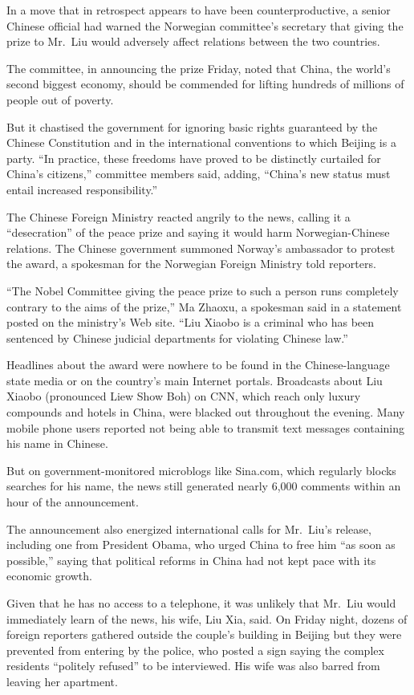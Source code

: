 ﻿\documentclass[12pt]{article}
\begin{document}
In a move that in retrospect appears to have been counterproductive, a senior Chinese official had
warned the Norwegian committee's secretary that giving the prize to Mr.~Liu would adversely affect
relations between the two countries.

The committee, in announcing the prize Friday, noted that China, the world's second biggest economy,
should be commended for lifting hundreds of millions of people out of poverty.

But it chastised the government for ignoring basic rights guaranteed by the Chinese Constitution and
in the international conventions to which Beijing is a party. ``In practice, these freedoms have
proved to be distinctly curtailed for China's citizens,'' committee members said, adding, ``China's
new status must entail increased responsibility.''

The Chinese Foreign Ministry reacted angrily to the news, calling it a ``desecration'' of the peace
prize and saying it would harm Norwegian-Chinese relations. The Chinese government summoned Norway's
ambassador to protest the award, a spokesman for the Norwegian Foreign Ministry told reporters.

``The Nobel Committee giving the peace prize to such a person runs completely contrary to the aims
of the prize,'' Ma Zhaoxu, a spokesman said in a statement posted on the ministry's Web site. ``Liu
Xiaobo is a criminal who has been sentenced by Chinese judicial departments for violating Chinese
law.''

Headlines about the award were nowhere to be found in the Chinese-language state media or on the
country's main Internet portals. Broadcasts about Liu Xiaobo (pronounced Liew Show Boh) on CNN,
which reach only luxury compounds and hotels in China, were blacked out throughout the evening. Many
mobile phone users reported not being able to transmit text messages containing his name in Chinese.

But on government-monitored microblogs like Sina.com, which regularly blocks searches for his name,
the news still generated nearly 6,000 comments within an hour of the announcement.

The announcement also energized international calls for Mr.~Liu's release, including one from
President Obama, who urged China to free him ``as soon as possible,'' saying that political reforms
in China had not kept pace with its economic growth.

Given that he has no access to a telephone, it was unlikely that Mr.~Liu would immediately learn of
the news, his wife, Liu Xia, said. On Friday night, dozens of foreign reporters gathered outside the
couple's building in Beijing but they were prevented from entering by the police, who posted a sign
saying the complex residents ``politely refused'' to be interviewed. His wife was also barred from
leaving her apartment.
\end{document}
